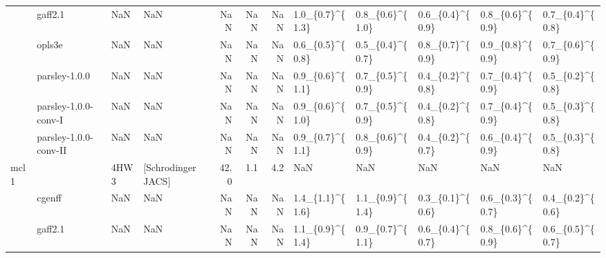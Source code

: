 \begin{tabular}{llllrrrlllll}
     & gaff2.1 &         NaN &                 NaN &         NaN &      NaN &            NaN &  1.0\_\{0.7\}\textasciicircum \{1.3\} &  0.8\_\{0.6\}\textasciicircum \{1.0\} &  0.6\_\{0.4\}\textasciicircum \{0.9\} &    0.8\_\{0.6\}\textasciicircum \{0.9\} &   0.7\_\{0.4\}\textasciicircum \{0.8\} \\
     & opls3e &         NaN &                 NaN &         NaN &      NaN &            NaN &  0.6\_\{0.5\}\textasciicircum \{0.8\} &  0.5\_\{0.4\}\textasciicircum \{0.7\} &  0.8\_\{0.7\}\textasciicircum \{0.9\} &    0.9\_\{0.8\}\textasciicircum \{0.9\} &   0.7\_\{0.6\}\textasciicircum \{0.9\} \\
     & parsley-1.0.0 &         NaN &                 NaN &         NaN &      NaN &            NaN &  0.9\_\{0.6\}\textasciicircum \{1.1\} &  0.7\_\{0.5\}\textasciicircum \{0.9\} &  0.4\_\{0.2\}\textasciicircum \{0.8\} &    0.7\_\{0.4\}\textasciicircum \{0.9\} &   0.5\_\{0.2\}\textasciicircum \{0.8\} \\
     & parsley-1.0.0-conv-I &         NaN &                 NaN &         NaN &      NaN &            NaN &  0.9\_\{0.6\}\textasciicircum \{1.0\} &  0.7\_\{0.5\}\textasciicircum \{0.9\} &  0.4\_\{0.2\}\textasciicircum \{0.8\} &    0.7\_\{0.4\}\textasciicircum \{0.9\} &   0.5\_\{0.3\}\textasciicircum \{0.8\} \\
     & parsley-1.0.0-conv-II &         NaN &                 NaN &         NaN &      NaN &            NaN &  0.9\_\{0.7\}\textasciicircum \{1.1\} &  0.8\_\{0.6\}\textasciicircum \{0.9\} &  0.4\_\{0.2\}\textasciicircum \{0.7\} &    0.6\_\{0.4\}\textasciicircum \{0.9\} &   0.5\_\{0.3\}\textasciicircum \{0.8\} \\
mcl1 &                       &        4HW3 &  [Schrodinger JACS] &        42.0 &      1.1 &            4.2 &              NaN &              NaN &              NaN &                NaN &               NaN \\
     & cgenff &         NaN &                 NaN &         NaN &      NaN &            NaN &  1.4\_\{1.1\}\textasciicircum \{1.6\} &  1.1\_\{0.9\}\textasciicircum \{1.4\} &  0.3\_\{0.1\}\textasciicircum \{0.6\} &    0.6\_\{0.3\}\textasciicircum \{0.7\} &   0.4\_\{0.2\}\textasciicircum \{0.6\} \\
     & gaff2.1 &         NaN &                 NaN &         NaN &      NaN &            NaN &  1.1\_\{0.9\}\textasciicircum \{1.4\} &  0.9\_\{0.7\}\textasciicircum \{1.1\} &  0.6\_\{0.4\}\textasciicircum \{0.7\} &    0.8\_\{0.6\}\textasciicircum \{0.9\} &   0.6\_\{0.5\}\textasciicircum \{0.7\} \\

\end{tabular}
